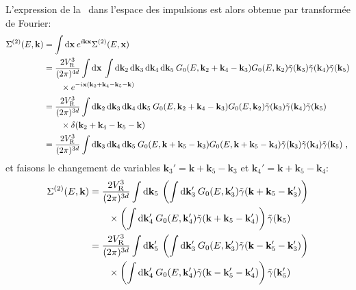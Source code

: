 L'expression de la \selfenergy\ dans l'espace des impulsions est alors obtenue par transformée de Fourier: 
\begin{align}
\Sigma^{(2)}(E,\mathbf{k})&=\int{\mathop{}\mathopen{}\mathrm{d}\mathbf{x} \: e^{i \mathbf{k}\mathbf{x}} \Sigma^{(2)}(E,\mathbf{x})} \\
&=\nonumber \frac{2V_{\mathrm{R}}^3}{(2\pi)^{4d}} \int{\mathop{}\mathopen{}\mathrm{d}\mathbf{x} \: \int{\mathop{}\mathopen{}\mathrm{d}\mathbf{k}_{\mathrm{2}}\mathop{}\mathopen{}\mathrm{d}\mathbf{k}_{\mathrm{3}}\mathop{}\mathopen{}\mathrm{d}\mathbf{k}_{\mathrm{4}}\mathop{}\mathopen{}\mathrm{d}\mathbf{k}_{\mathrm{5}}\: G_0(E,\mathbf{k}_{\mathrm{2}}+\mathbf{k}_{\mathrm{4}}-\mathbf{k}_{\mathrm{3}}) G_0(E,\mathbf{k}_{\mathrm{2}})\tilde{\gamma}(\mathbf{k}_{\mathrm{3}})\tilde{\gamma}(\mathbf{k}_{\mathrm{4}})\tilde{\gamma}(\mathbf{k}_{\mathrm{5}})}} \\
& \qquad \times e^{-i \mathbf{x} (\mathbf{k}_{\mathrm{2}} + \mathbf{k}_{\mathrm{4}} - \mathbf{k}_{\mathrm{5}} - \mathbf{k})} \\
&=\nonumber \frac{2V_{\mathrm{R}}^3}{(2\pi)^{3d}} \int{\mathop{}\mathopen{}\mathrm{d}\mathbf{k}_{\mathrm{2}}\mathop{}\mathopen{}\mathrm{d}\mathbf{k}_{\mathrm{3}}\mathop{}\mathopen{}\mathrm{d}\mathbf{k}_{\mathrm{4}}\mathop{}\mathopen{}\mathrm{d}\mathbf{k}_{\mathrm{5}}\: G_0(E,\mathbf{k}_{\mathrm{2}}+\mathbf{k}_{\mathrm{4}}-\mathbf{k}_{\mathrm{3}}) G_0(E,\mathbf{k}_{\mathrm{2}})\tilde{\gamma}(\mathbf{k}_{\mathrm{3}})\tilde{\gamma}(\mathbf{k}_{\mathrm{4}})\tilde{\gamma}(\mathbf{k}_{\mathrm{5}})}\\
& \qquad \times\delta(\mathbf{k}_{\mathrm{2}} + \mathbf{k}_{\mathrm{4}} - \mathbf{k}_{\mathrm{5}} - \mathbf{k}) \\
&= \frac{2V_{\mathrm{R}}^3}{(2\pi)^{3d}} \int{\mathop{}\mathopen{}\mathrm{d}\mathbf{k}_{\mathrm{3}} \mathop{}\mathopen{}\mathrm{d}\mathbf{k}_{\mathrm{4}}\mathop{}\mathopen{}\mathrm{d}\mathbf{k}_{\mathrm{5}} \: G_0(E,\mathbf{k}+\mathbf{k}_{\mathrm{5}}-\mathbf{k}_{\mathrm{3}}) G_0(E,\mathbf{k}+\mathbf{k}_{\mathrm{5}}-\mathbf{k}_{\mathrm{4}})\tilde{\gamma}(\mathbf{k}_{\mathrm{3}})\tilde{\gamma}(\mathbf{k}_{\mathrm{4}})\tilde{\gamma}(\mathbf{k}_{\mathrm{5}})} \text{ ,}
\end{align}
et faisons le changement de variables $\mathbf{k}_{\mathrm{3}}'=\mathbf{k}+\mathbf{k}_{\mathrm{5}}-\mathbf{k}_{\mathrm{3}}$ et $\mathbf{k}_{\mathrm{4}}'=\mathbf{k}+\mathbf{k}_{\mathrm{5}}-\mathbf{k}_{\mathrm{4}}$:
\begin{align}
\Sigma^{(2)}(E,\mathbf{k})&= \frac{2V_{\mathrm{R}}^3}{(2\pi)^{3d}} \int{\mathop{}\mathopen{}\mathrm{d}\mathbf{k}_{\mathrm{5}} \: \left( \int{\mathop{}\mathopen{}\mathrm{d}\mathbf{k}_{\mathrm{3}}'\: G_0(E,\mathbf{k}_{\mathrm{3}}')\tilde{\gamma}(\mathbf{k}+\mathbf{k}_{\mathrm{5}}-\mathbf{k}_{\mathrm{3}}')} \right)} \\
&\nonumber \qquad \times\left( \int{\mathop{}\mathopen{}\mathrm{d}\mathbf{k}_{\mathrm{4}}'\: G_0(E,\mathbf{k}_{\mathrm{4}}') \tilde{\gamma}(\mathbf{k}+\mathbf{k}_{\mathrm{5}}-\mathbf{k}_{\mathrm{4}}')}\right) \tilde{\gamma}(\mathbf{k}_{\mathrm{5}})  \\
&= \frac{2V_{\mathrm{R}}^3}{(2\pi)^{3d}} \int{\mathop{}\mathopen{}\mathrm{d}\mathbf{k}_{\mathrm{5}}' \: \left( \int{\mathop{}\mathopen{}\mathrm{d}\mathbf{k}_{\mathrm{3}}'\: G_0(E,\mathbf{k}_{\mathrm{3}}')\tilde{\gamma}(\mathbf{k}-\mathbf{k}_{\mathrm{5}}'-\mathbf{k}_{\mathrm{3}}')} \right)}\\
&\nonumber\qquad\times \left( \int{\mathop{}\mathopen{}\mathrm{d}\mathbf{k}_{\mathrm{4}}'\: G_0(E,\mathbf{k}_{\mathrm{4}}') \tilde{\gamma}(\mathbf{k}-\mathbf{k}_{\mathrm{5}}'-\mathbf{k}_{\mathrm{4}}')}\right) \tilde{\gamma}(\mathbf{k}_{\mathrm{5}}') 
\end{align}
